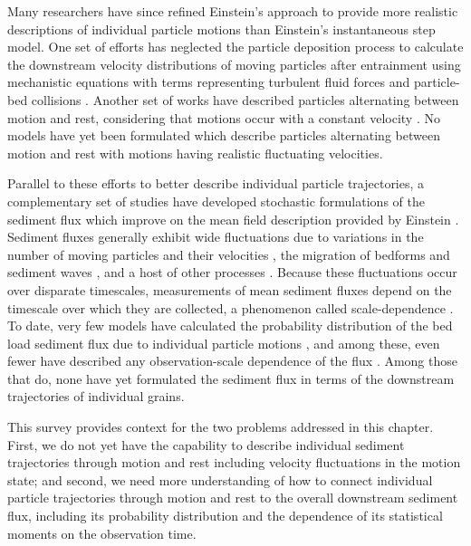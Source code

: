 Many researchers have since refined Einstein's approach to provide more realistic descriptions of individual particle motions than Einstein's instantaneous step model.
One set of efforts has neglected the particle deposition process to calculate the downstream velocity distributions of moving particles after entrainment using mechanistic equations with terms representing turbulent fluid forces and particle-bed collisions \citep{Ancey2014,Fan2014}. 
Another set of works have described particles alternating between motion and rest, considering that motions occur with a constant velocity \citep{Lisle1998,Lajeunesse2017,Pierce2020b}. 
No models have yet been formulated which describe particles alternating between motion and rest with motions having realistic fluctuating velocities.

Parallel to these efforts to better describe individual particle trajectories, a complementary set of studies have developed stochastic formulations of the sediment flux which improve on the mean field description provided by Einstein \citep{Turowski2010,Furbish2012a,Ancey2020}. 
Sediment fluxes generally exhibit wide fluctuations due to variations in the number of moving particles and their velocities \citep{Bohm2005a,Ancey2006,Furbish2012a}, the migration of bedforms and sediment waves \citep{Guala2014,Recking2012}, and a host of other processes \citep{Dhont2018}.
Because these fluctuations occur over disparate timescales, measurements of mean sediment fluxes depend on the timescale over which they are collected, a phenomenon called scale-dependence \citep{Saletti2015,Dhont2018,Singh2009,Turowski2010,Ancey2020}.
To date, very few models have calculated the probability distribution of the bed load sediment flux due to individual particle motions \citep{Ancey2008,Ancey2014}, and among these, even fewer have described any observation-scale dependence of the flux \citep{Ancey2020,Turowski2010}.
Among those that do, none have yet formulated the sediment flux in terms of the downstream trajectories of individual grains.

This survey provides context for the two problems addressed in this chapter.
First, we do not yet have the capability to describe individual sediment trajectories through motion and rest including velocity fluctuations in the motion state; and second, we need more understanding of how to connect individual particle trajectories through motion and rest to the overall downstream sediment flux, including its probability distribution and the dependence of its statistical moments on the observation time.

